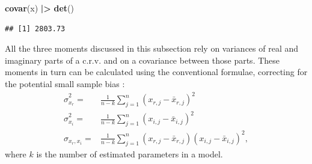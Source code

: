 \documentclass[
]{book}
\newenvironment{Shaded}{\begin{snugshade}}{\end{snugshade}}
\newcommand{\ErrorTok}[1]{\textcolor[rgb]{0.64,0.00,0.00}{\textbf{#1}}}
\newcommand{\KeywordTok}[1]{\textcolor[rgb]{0.13,0.29,0.53}{\textbf{#1}}}
\newcommand{\NormalTok}[1]{#1}
\newcommand{\OperatorTok}[1]{\textcolor[rgb]{0.81,0.36,0.00}{\textbf{#1}}}
\newcommand{\StringTok}[1]{\textcolor[rgb]{0.31,0.60,0.02}{#1}}
\begin{document}
\begin{Shaded}
\begin{Highlighting}[]
\KeywordTok{covar}\NormalTok{(x) }\OperatorTok{|}\ErrorTok{\textgreater{}}\StringTok{ }\KeywordTok{det}\NormalTok{()}
\end{Highlighting}
\end{Shaded}

\begin{verbatim}
## [1] 2803.73
\end{verbatim}

All the three moments discussed in this subsection rely on variances of real and imaginary parts of a c.r.v. and on a covariance between those parts. These moments in turn can be calculated using the conventional formulae, correcting for the potential small sample bias \citep{referenceSBA}:
\begin{equation}
    \begin{aligned}
        \hat{\sigma}_{x_r}^2 = & \frac{1}{n-k} \sum_{j=1}^n (x_{r,j}-\bar{x}_{r,j})^2 \\
        \hat{\sigma}_{x_i}^2 = & \frac{1}{n-k} \sum_{j=1}^n (x_{i,j}-\bar{x}_{i,j})^2 \\
        \hat{\sigma}_{x_r, x_i} = & \frac{1}{n-k} \sum_{j=1}^n (x_{r,j}-\bar{x}_{r,j})(x_{i,j}-\bar{x}_{i,j})^2 ,
    \end{aligned}
    \label{eq:crvMomentSecondSample}
\end{equation}
where \(k\) is the number of estimated parameters in a model.
\end{document}
